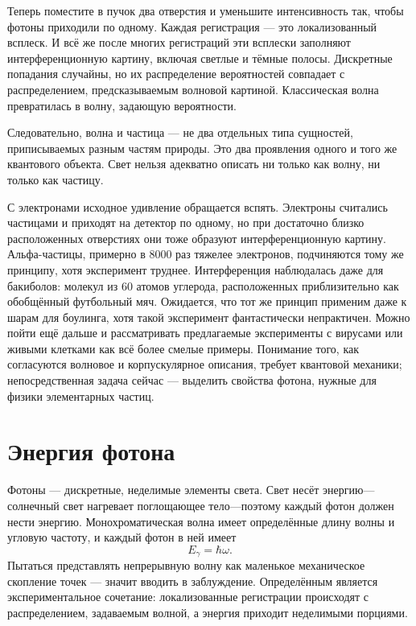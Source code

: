 Теперь поместите в пучок два отверстия и уменьшите интенсивность так, чтобы фотоны приходили по одному. Каждая регистрация — это локализованный всплеск. И всё же после многих регистраций эти всплески заполняют интерференционную картину, включая светлые и тёмные полосы. Дискретные попадания случайны, но их распределение вероятностей совпадает с распределением, предсказываемым волновой картиной. Классическая волна превратилась в волну, задающую вероятности.

Следовательно, волна и частица — не два отдельных типа сущностей, приписываемых разным частям природы. Это два проявления одного и того же квантового объекта. Свет нельзя адекватно описать ни только как волну, ни только как частицу.

С электронами исходное удивление обращается вспять. Электроны считались частицами и приходят на детектор по одному, но при достаточно близко расположенных отверстиях они тоже образуют интерференционную картину. Альфа-частицы, примерно в 8000 раз тяжелее электронов, подчиняются тому же принципу, хотя эксперимент труднее. Интерференция наблюдалась даже для бакиболов: молекул из 60 атомов углерода, расположенных приблизительно как обобщённый футбольный мяч. Ожидается, что тот же принцип применим даже к шарам для боулинга, хотя такой эксперимент фантастически непрактичен. Можно пойти ещё дальше и рассматривать предлагаемые эксперименты с вирусами или живыми клетками как всё более смелые примеры. Понимание того, как согласуются волновое и корпускулярное описания, требует квантовой механики; непосредственная задача сейчас — выделить свойства фотона, нужные для физики элементарных частиц.

\section{Энергия фотона}

Фотоны — дискретные, неделимые элементы света. Свет несёт энергию---солнечный свет нагревает поглощающее тело---поэтому каждый фотон должен нести энергию. Монохроматическая волна имеет определённые длину волны и угловую частоту, и каждый фотон в ней имеет
\begin{equation}
E_\gamma=\hbar\omega.
\end{equation}
Пытаться представлять непрерывную волну как маленькое механическое скопление точек — значит вводить в заблуждение. Определённым является экспериментальное сочетание: локализованные регистрации происходят с распределением, задаваемым волной, а энергия приходит неделимыми порциями.

